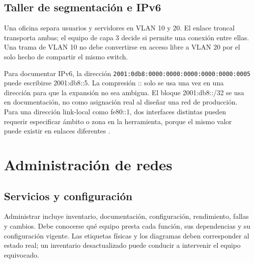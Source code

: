 \subsection{Taller de segmentación e IPv6}
Una oficina separa usuarios y servidores en VLAN 10 y 20. El enlace troncal transporta ambas; el equipo de capa 3 decide si permite una conexión entre ellas. Una trama de VLAN 10 no debe convertirse en acceso libre a VLAN 20 por el solo hecho de compartir el mismo switch.
\begin{center}
\end{center}
Para documentar IPv6, la dirección \nolinkurl{2001:0db8:0000:0000:0000:0000:0000:0005} puede escribirse 2001:db8::5. La compresión :: solo se usa una vez en una dirección para que la expansión no sea ambigua. El bloque 2001:db8::/32 se usa en documentación, no como asignación real al diseñar una red de producción. Para una dirección link-local como fe80::1, dos interfaces distintas pueden requerir especificar ámbito o zona en la herramienta, porque el mismo valor puede existir en enlaces diferentes \cite{rfc4291,rfc4861,vlan}.


\section{Administración de redes}\label{sec:r2}
\subsection{Servicios y configuración}
Administrar incluye inventario, documentación, configuración, rendimiento, fallas y cambios. Debe conocerse qué equipo presta cada función, sus dependencias y su configuración vigente. Las etiquetas físicas y los diagramas deben corresponder al estado real; un inventario desactualizado puede conducir a intervenir el equipo equivocado.

